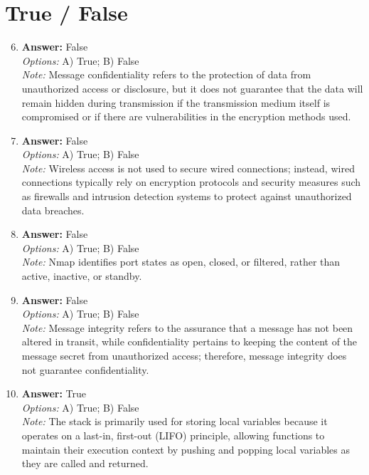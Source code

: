 \documentclass[12pt]{article}
\begin{document}
\section*{True / False}
\begin{enumerate}[label=\arabic*.]
\setcounter{enumi}{5}
\item \textbf{Answer:} False
\\ \textit{Options:} A) True; B) False
\\ \textit{Note:} Message confidentiality refers to the protection of data from unauthorized access or disclosure, but it does not guarantee that the data will remain hidden during transmission if the transmission medium itself is compromised or if there are vulnerabilities in the encryption methods used.
\item \textbf{Answer:} False
\\ \textit{Options:} A) True; B) False
\\ \textit{Note:} Wireless access is not used to secure wired connections; instead, wired connections typically rely on encryption protocols and security measures such as firewalls and intrusion detection systems to protect against unauthorized data breaches.
\item \textbf{Answer:} False
\\ \textit{Options:} A) True; B) False
\\ \textit{Note:} Nmap identifies port states as open, closed, or filtered, rather than active, inactive, or standby.
\item \textbf{Answer:} False
\\ \textit{Options:} A) True; B) False
\\ \textit{Note:} Message integrity refers to the assurance that a message has not been altered in transit, while confidentiality pertains to keeping the content of the message secret from unauthorized access; therefore, message integrity does not guarantee confidentiality.
\item \textbf{Answer:} True
\\ \textit{Options:} A) True; B) False
\\ \textit{Note:} The stack is primarily used for storing local variables because it operates on a last-in, first-out (LIFO) principle, allowing functions to maintain their execution context by pushing and popping local variables as they are called and returned.
\end{enumerate}
\end{document}
